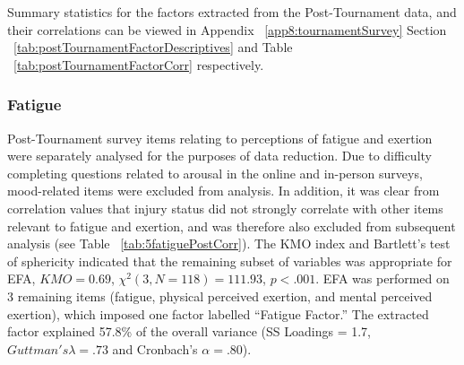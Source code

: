 



Summary statistics for the factors extracted from the Post-Tournament data, and their correlations can be viewed in Appendix ~\ref{app8:tournamentSurvey} Section
 ~\ref{tab:postTournamentFactorDescriptives} and Table ~\ref{tab:postTournamentFactorCorr} respectively.



\newpage
{} %
\begin{landscape}






\clearpage




\clearpage




\end{landscape}
\restoregeometry








\subsubsection{Fatigue \label{app8:fatigueEFA}}

Post-Tournament survey items relating to perceptions of fatigue and exertion were separately analysed for the purposes of data reduction.  Due to difficulty completing questions related to arousal in the online and in-person surveys, mood-related items were excluded from analysis.  In addition, it was clear from correlation values that injury status did not strongly correlate with other items relevant to fatigue and exertion, and was therefore also excluded from subsequent analysis (see Table ~\ref{tab:5fatiguePostCorr}).  The KMO index and Bartlett's test of sphericity indicated that the remaining subset of variables was appropriate for EFA, $KMO =  0.69$, $\chi^2(3, N = 118) = 111.93$, $p < .001$. EFA was performed on 3 remaining items (fatigue, physical perceived exertion, and mental perceived exertion), which imposed one factor labelled ``Fatigue Factor.''  The extracted factor explained 57.8\% of the overall variance (SS Loadings = 1.7, $Guttman's\lambda =.73$ and Cronbach's $\alpha = .80$).

